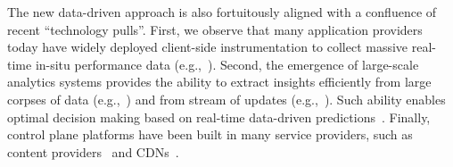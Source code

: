 The new data-driven approach is also fortuitously aligned with a confluence of 
recent  ``technology pulls''. 
First, we observe that many application providers today have widely deployed client-side 
instrumentation to collect massive real-time in-situ performance data  (e.g.,~\cite{sigcomm11,via,imc12akamai,artizanetworks}). 
Second, the emergence of large-scale analytics systems provides the ability to extract insights efficiently from large corpses 
of data (e.g.,~\cite{spark}) and from stream of updates (e.g.,~\cite{zaharia2013discretized}). 
Such ability enables optimal decision making based on real-time data-driven 
predictions~\cite{velox-cidr}.
Finally, control plane platforms have been built in many service providers, such as content providers~\cite{c3} and CDNs~\cite{mukerjee2015practical}.

%
%
%





